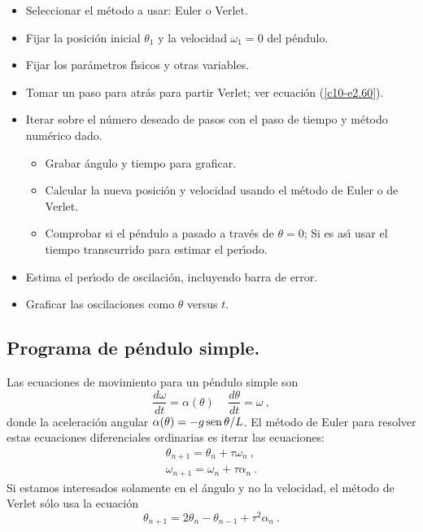 \begin{table}
\hrulefill
\begin{itemize}
\item Seleccionar el m{\'e}todo a usar: Euler o Verlet.
\item Fijar la posici{\'o}n inicial $\theta_1$ y la velocidad $\omega_1=0$ del p{\'e}ndulo.
\item Fijar los par{\'a}metros f{\'\i}sicos y otras variables.
\item Tomar un paso para atr{\'a}s para partir Verlet; ver ecuaci{\'o}n (\ref{c10-e2.60}).
\item Iterar sobre el n{\'u}mero deseado de pasos con el paso de tiempo y
  m{\'e}todo num{\'e}rico dado.
  \begin{itemize}
  \item Grabar {\'a}ngulo y tiempo para graficar.
  \item Calcular la nueva posici{\'o}n y velocidad usando el m{\'e}todo de
    Euler o de Verlet.
  \item Comprobar si el p{\'e}ndulo a pasado a trav{\'e}s de $\theta=0$; Si es
    as{\'\i} usar el tiempo transcurrido para estimar el per{\'\i}odo.
\end{itemize}
\item Estima el per{\'\i}odo de oscilaci{\'o}n, incluyendo barra de error.
\item Graficar las oscilaciones como $\theta$ versus $t$.
\end{itemize}
\caption{Bosquejo del programa {\tt pendulo}, el cual calcula el tiempo
  de evoluci{\'o}n de un p{\'e}ndulo simple usando el m{\'e}todo de Euler o Verlet.}\label{c10-t2}
\hrulefill
\end{table}

\subsection{Programa de p{\'e}ndulo simple.}

Las ecuaciones de movimiento para un p{\'e}ndulo simple son
\begin{equation}
\label{c10-e2.61}
\frac{d\omega}{dt}=\alpha(\theta)\, \quad \frac{d\theta}{dt}=\omega\ ,
\end{equation}
donde la aceleraci{\'o}n angular $\alpha(\theta)=-g \operatorname{sen}\theta /L$. El m{\'e}todo de Euler
para resolver estas ecuaciones diferenciales ordinarias es iterar las
ecuaciones: 
\begin{align}
\label{c10-e2.62}
\theta_{n+1}=\theta_n+\tau\omega_n\ ,\\
\label{c10-e2.63}
\omega_{n+1}=\omega_n+\tau\alpha_n\ .
\end{align}
Si estamos interesados solamente en el {\'a}ngulo y no la velocidad, el
m{\'e}todo de Verlet s{\'o}lo usa la ecuaci{\'o}n
\begin{equation}
\label{c10-e2.64}
\theta_{n+1}=2\theta_n-\theta_{n-1}+\tau^2\alpha_n\ .
\end{equation}

